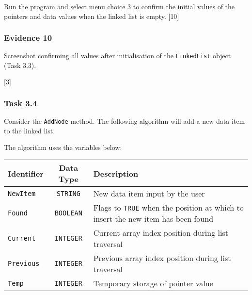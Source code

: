 Run the program and select menu choice 3 to confirm the initial values
of the pointers and data values when the linked list is empty. {[}10{]}

\subsubsection*{Evidence 10}

Screenshot confirming all values after initialisation of the \texttt{LinkedList}
object (Task 3.3). 

\hfill{} {[}3{]}

\subsubsection*{Task 3.4}

Consider the \texttt{AddNode} method. The following algorithm will
add a new data item to the linked list. 

The algorithm uses the variables below:
\begin{center}
\begin{tabular}{|l|c|>{\raggedright}p{}|}
\hline 
\texttt{\hspace{0.01\columnwidth}}Identifier & \texttt{\hspace{0.01\columnwidth}}Data Type & \texttt{\hspace{0.01\columnwidth}}Description\tabularnewline
\hline 
\texttt{NewItem} & \texttt{STRING} & New data item input by the user\tabularnewline
\hline 
\texttt{Found} & \texttt{BOOLEAN} & Flags to \texttt{TRUE} when the position at which to insert the new
item has been found\tabularnewline
\hline 
\texttt{Current} & \texttt{INTEGER} & Current array index position during list traversal\tabularnewline
\hline 
\texttt{Previous} & \texttt{INTEGER} & Previous array index position during list traversal\tabularnewline
\hline 
\texttt{Temp} & \texttt{INTEGER} & Temporary storage of pointer value\tabularnewline
\hline 
\end{tabular}
\par\end{center}

